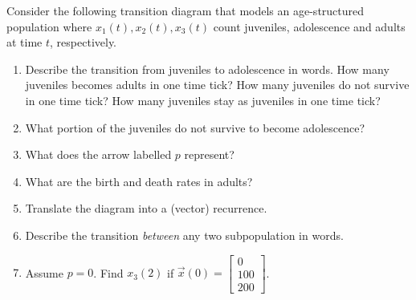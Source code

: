 \documentclass[../main.tex]{subfiles}
\begin{document}
\begin{exercise}
  Consider the following transition diagram that models an age-structured population where \(x_{1}(t), x_{2}(t), x_{3}(t)\) count juveniles, adolescence and adults at time \(t\), respectively.


  \begin{enumerate}
    \item Describe the transition from juveniles to adolescence in words. How many juveniles becomes adults in one time tick? How many juveniles do not survive in one time tick? How many juveniles stay as juveniles in one time tick?
    \item What portion of the juveniles do not survive to become adolescence?
    \item What does the arrow labelled \(p\) represent?
    \item What are the birth and death rates in adults?
    \item Translate the diagram into a (vector) recurrence.
    \item Describe the transition \emph{between} any two subpopulation in words.
    \item Assume \(p = 0\). Find \(x_{3}(2)\) if \(\vec{x}(0) = \begin{bmatrix} 0 \\ 100 \\ 200 \end{bmatrix}\).
  \end{enumerate}


\end{exercise}
\end{document}
